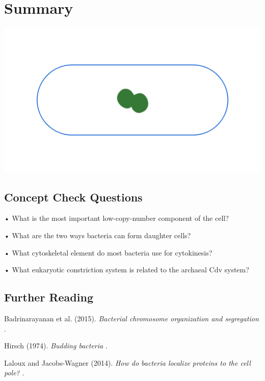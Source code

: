 \documentclass[]{tufte-book}
\begin{document}
\hypertarget{summary-4}{%
\section{Summary}\label{summary-4}}

\includegraphics{img/summaries/05_Division}

\hypertarget{concept-check-questions-4}{%
\subsection*{Concept Check Questions}\label{concept-check-questions-4}}

• What is the most important low-copy-number component of the cell?

• What are the two ways bacteria can form daughter cells?

• What cytoskeletal element do most bacteria use for cytokinesis?

• What eukaryotic constriction system is related to the archaeal Cdv system?

\hypertarget{further-reading-4}{%
\subsection*{Further Reading}\label{further-reading-4}}

Badrinarayanan et al. (2015). \emph{Bacterial chromosome organization and segregation} \citep{badrinarayanan2015}.

Hirsch (1974). \emph{Budding bacteria} \citep{hirsch1974}.

Laloux and Jacobs-Wagner (2014). \emph{How do bacteria localize proteins to the cell pole?} \citep{laloux2014}.
\end{document}
